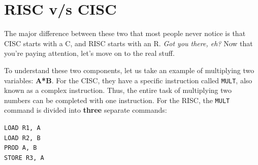 \documentclass[conference]{IEEEtran}
\begin{document}
\section{RISC v/s CISC}
The major difference between these two that most people never notice is that CISC starts with a C, and RISC starts with an R. \textit{Got you there, eh?} Now that you’re paying attention, let’s move on to the real stuff.

To understand these two components, let us take an example of multiplying two variables: \textbf{A*B}. For the CISC, they have a specific instruction called \verb|MULT|, also known as a complex instruction. Thus, the entire task of multiplying two numbers can be completed with one instruction. For the RISC, the \verb|MULT| command is divided into \textbf{three} separate commands:
\begin{center}
\verb|LOAD R1, A|\\
\verb|LOAD R2, B|\\
\verb|PROD A, B|\\
\verb|STORE R3, A|
\end{center}
\end{document}
